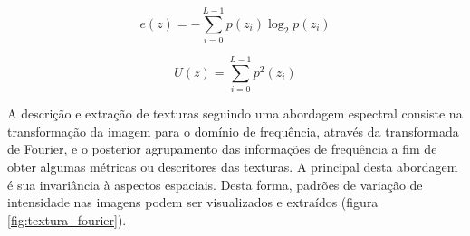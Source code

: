 \begin{equation}
	\displaystyle e(z) = - \sum_{i=0}^{L-1} p(z_i) \log_2 p(z_i)
	\label{eq:textura_entropia}
\end{equation}

\begin{equation}
	\displaystyle U(z) = \sum_{i=0}^{L-1} p^2(z_i)
	\label{eq:textura_uniformidade}
\end{equation}

A descrição e extração de texturas seguindo uma abordagem espectral consiste na transformação da imagem para o domínio de frequência, através da transformada de Fourier, e o posterior agrupamento das informações de frequência a fim de obter algumas métricas ou descritores das texturas. A principal desta abordagem é sua invariância à aspectos espaciais. Desta forma, padrões de variação de intensidade nas imagens podem ser visualizados e extraídos (figura \ref{fig:textura_fourier}).

